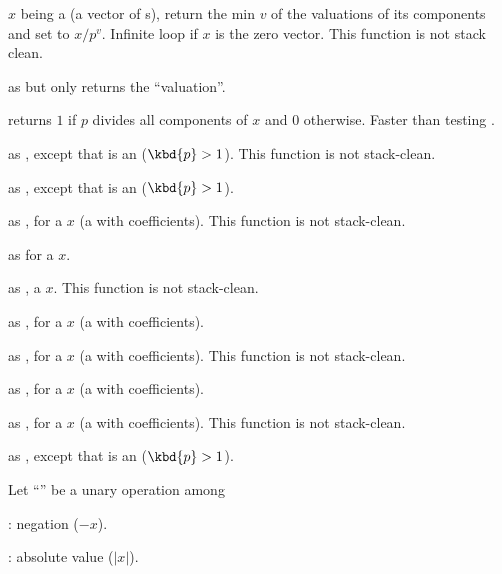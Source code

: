 $x$ being a  (a vector
of s), return the min $v$ of the valuations of its components and
set  to $x/p^v$. Infinite loop if $x$ is the zero vector.
This function is not stack clean.

 as  but only returns the
``valuation''.

 returns $1$ if $p$ divides all components
of $x$ and $0$ otherwise. Faster than testing .

 as ,
except that  is an  ($\kbd{p} > 1$).
This function is not stack-clean.

 as ,
except that  is an  ($\kbd{p} > 1$).


 as , for
a  $x$ (a  with  coefficients).
This function is not stack-clean.

 as  for a  $x$.

 as ,
a  $x$.
This function is not stack-clean.

 as , for
a  $x$ (a  with  coefficients).

 as , for
a  $x$ (a  with  coefficients).
This function is not stack-clean.

 as , for
a  $x$ (a  with  coefficients).

 as , for
a  $x$ (a  with  coefficients).
This function is not stack-clean.

 as ,
except that  is an  ($\kbd{p} > 1$).

 Let ``\op'' be a unary operation among

\item {}: negation ($-x$).

\item {}: absolute value ($|x|$).

